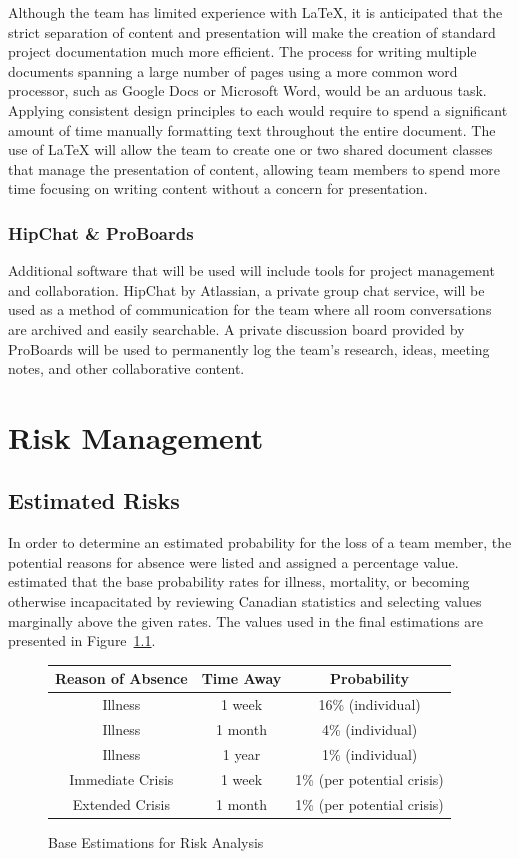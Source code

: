\documentclass{GlobalDocument}
\begin{document}
Although the team has limited experience with \LaTeX{}, it is anticipated that the strict separation of content and presentation will make the creation of standard project documentation much more efficient. The process for writing multiple documents spanning a large number of pages using a more common word processor, such as Google Docs or Microsoft Word, would be an arduous task. Applying consistent design principles to each would require \ourteam{} to spend a significant amount of time manually formatting text throughout the entire document. The use of \LaTeX{} will allow the team to create one or two shared document classes that manage the presentation of content, allowing team members to spend more time focusing on writing content without a concern for presentation.

\subsection{HipChat \& ProBoards}
Additional software that will be used will include tools for project management and collaboration. HipChat by Atlassian, a private group chat service, will be used as a method of communication for the team where all room conversations are archived and easily searchable. A private discussion board provided by ProBoards will be used to permanently log the team's research, ideas, meeting notes, and other collaborative content.


\chapter{Risk Management}
\section{Estimated Risks}
In order to determine an estimated probability for the loss of a team member, the potential reasons for absence were listed and assigned a percentage value. \ourteam{} estimated that the base probability rates for illness, mortality, or becoming otherwise incapacitated by reviewing Canadian statistics and selecting values marginally above the given rates. The values used in the final estimations are presented in Figure~\ref{fig:risk_base_percentages}.

\begin{figure}[htb]
\caption{Base Estimations for Risk Analysis}
\label{fig:risk_base_percentages}
\centering\begin{tabular}{| c | c | c |}
\hline
Reason of Absence & Time Away & Probability\\ \hline
Illness & 1 week & 16\% (individual)\\ \hline
Illness & 1 month & 4\% (individual)\\ \hline
Illness & 1 year & 1\% (individual)\\ \hline
Immediate Crisis & 1 week & 1\% (per potential crisis)\\ \hline
Extended Crisis & 1 month & 1\% (per potential crisis)\\ \hline
\end{tabular}
\end{figure}
\end{document}

